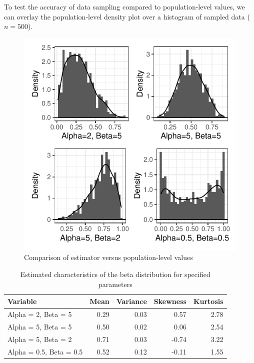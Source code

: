 \documentclass{article}\usepackage[]{graphicx}\usepackage[]{xcolor}
\begin{document}
\begin{multicols}{2}
To test the accuracy of data sampling compared to population-level values, we can overlay the population-level density plot over a histogram of sampled data ($n=500$).

\begin{figure}[H]
 \begin{center}
 \includegraphics[scale=0.75]{density_histogram.pdf}
 \caption{Comparison of estimator versus population-level values}
 \label{fig2}
 \end{center}
 \end{figure}





\begin{table}[H]
\centering
\begingroup\small
\begin{tabular}{lrrrr}
  \hline
Variable & Mean & Variance & Skewness & Kurtosis \\ 
  \hline
Alpha = 2, Beta = 5 & 0.29 & 0.03 & 0.57 & 2.78 \\ 
  Alpha = 5, Beta = 5 & 0.50 & 0.02 & 0.06 & 2.54 \\ 
  Alpha = 5, Beta = 2 & 0.71 & 0.03 & -0.74 & 3.22 \\ 
  Alpha = 0.5, Beta = 0.5 & 0.52 & 0.12 & -0.11 & 1.55 \\ 
   \hline
\end{tabular}
\endgroup
\caption{Estimated characteristics of the beta distribution for specified parameters} 
\label{estim.tab}
\end{table}



\end{multicols}
\end{document}
